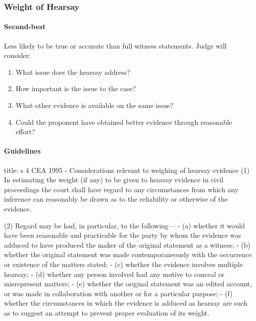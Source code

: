 \documentclass[
]{article}
\newenvironment{Shaded}{}{}
\newcommand{\NormalTok}[1]{#1}
\providecommand{\tightlist}{%
  \setlength{\itemsep}{0pt}\setlength{\parskip}{0pt}}
\begin{document}
\hypertarget{weight-of-hearsay}{%
\subsubsection{Weight of Hearsay}\label{weight-of-hearsay}}

\hypertarget{second-best}{%
\paragraph{Second-best}\label{second-best}}

Less likely to be true or accurate than full witness statements. Judge
will consider:

\begin{enumerate}
\def\labelenumi{\arabic{enumi}.}
\tightlist
\item
  What issue does the hearsay address?
\item
  How important is the issue to the case?
\item
  What other evidence is available on the same issue?
\item
  Could the proponent have obtained better evidence through reasonable
  effort?
\end{enumerate}

\hypertarget{guidelines}{%
\paragraph{Guidelines}\label{guidelines}}

\begin{Shaded}
\begin{Highlighting}[]
\NormalTok{title: s 4 CEA 1995 {-}  Considerations relevant to weighing of hearsay evidence}
\NormalTok{(1) In estimating the weight (if any) to be given to hearsay evidence in civil proceedings the court shall have regard to any circumstances from which any inference can reasonably be drawn as to the reliability or otherwise of the evidence.}

\NormalTok{(2) Regard may be had, in particular, to the following—}
\NormalTok{{-} (a) whether it would have been reasonable and practicable for the party by whom the evidence was adduced to have produced the maker of the original statement as a witness;}
\NormalTok{{-} (b) whether the original statement was made contemporaneously with the occurrence or existence of the matters stated;}
\NormalTok{{-} (c) whether the evidence involves multiple hearsay;}
\NormalTok{{-} (d) whether any person involved had any motive to conceal or misrepresent matters;}
\NormalTok{{-} (e) whether the original statement was an edited account, or was made in collaboration with another or for a particular purpose;}
\NormalTok{{-} (f) whether the circumstances in which the evidence is adduced as hearsay are such as to suggest an attempt to prevent proper evaluation of its weight.}
\end{Highlighting}
\end{Shaded}
\end{document}
